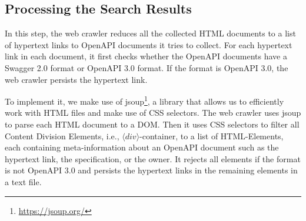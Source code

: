 \subsection{Processing the Search Results}
In this step, the web crawler reduces all the collected HTML documents to a list of hypertext links to OpenAPI documents it tries to collect. 
For each hypertext link in each document, it first checks whether the OpenAPI documents have a Swagger 2.0 format or OpenAPI 3.0 format. If the format is OpenAPI 3.0, the web crawler persists the hypertext link.

To implement it, we make use of jsoup\footnote{\url{https://jsoup.org/}}, a library that allows us to efficiently work with HTML files and make use of CSS selectors.
The web crawler uses jsoup to parse each HTML document to a DOM. Then it uses CSS selectors to filter all Content Division Elements, i.e., $\langle div \rangle$-container, to a list of HTML-Elements, each containing meta-information about an OpenAPI document such as the hypertext link, the specification, or the owner. It rejects all elements if the format is not OpenAPI 3.0 and persists the hypertext links in the remaining elements in a text file.
